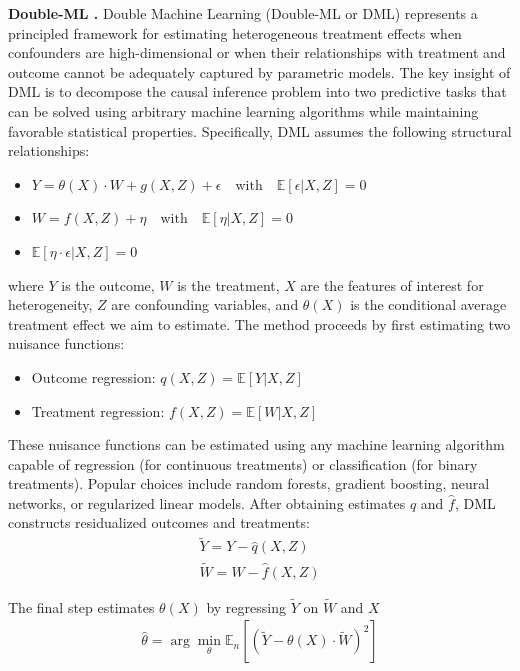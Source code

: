 \documentclass{article} %
\begin{document}
\textbf{Double-ML \citep{chernozhukov2018double}.} Double Machine Learning (Double-ML or DML) represents a principled framework for estimating heterogeneous treatment effects when confounders are high-dimensional or when their relationships with treatment and outcome cannot be adequately captured by parametric models. The key insight of DML is to decompose the causal inference problem into two predictive tasks that can be solved using arbitrary machine learning algorithms while maintaining favorable statistical properties. Specifically, DML assumes the following structural relationships:
\begin{itemize}[leftmargin=20pt, itemsep=0pt,parsep=0pt,partopsep=0pt,topsep=0pt]
    \item $Y = \theta(X) \cdot W + g(X, Z) + \epsilon \quad \text{with} \quad \mathbb{E}[\epsilon | X, Z] = 0$
    \item $W = f(X, Z) + \eta \quad \text{with} \quad \mathbb{E}[\eta | X, Z] = 0$
    \item $\mathbb{E}[\eta \cdot \epsilon | X, Z] = 0$
\end{itemize}
where $Y$ is the outcome, $W$ is the treatment, $X$ are the features of interest for heterogeneity, $Z$ are confounding variables, and $\theta(X)$ is the conditional average treatment effect we aim to estimate.
The method proceeds by first estimating two nuisance functions:
\begin{itemize}[leftmargin=20pt, itemsep=0pt,parsep=0pt,partopsep=0pt,topsep=0pt]
    \item Outcome regression: $q(X, Z) = \mathbb{E}[Y | X, Z]$
    \item Treatment regression: $f(X, Z) = \mathbb{E}[W | X, Z]$
\end{itemize}
These nuisance functions can be estimated using any machine learning algorithm capable of regression (for continuous treatments) or classification (for binary treatments). Popular choices include random forests, gradient boosting, neural networks, or regularized linear models. After obtaining estimates $\hat{q}$ and $\hat{f}$, DML constructs residualized outcomes and treatments:
\begin{align*}
    \tilde{Y} = Y - \hat{q}(X, Z)\\
    \tilde{W} = W - \hat{f}(X, Z)
\end{align*}

The final step estimates $\theta(X)$ by regressing $\tilde{Y}$ on $\tilde{W}$ and $X$
\begin{align*}
    \hat{\theta} = \arg\min_{\theta} \mathbb{E}_n[(\tilde{Y} - \theta(X) \cdot \tilde{W})^2]    
\end{align*}
\end{document}
